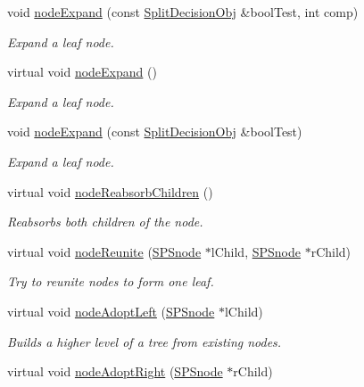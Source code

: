 \begin{DoxyCompactItemize}
void \hyperlink{classsubpavings_1_1SPSnode_a0728b0ec4deee17f6a729a97c8b5a560}{node\-Expand} (const \hyperlink{classsubpavings_1_1SplitDecisionObj}{\-Split\-Decision\-Obj} \&bool\-Test, int comp)
\begin{DoxyCompactList}\small\item\em \-Expand a leaf node. \end{DoxyCompactList}\item 
virtual void \hyperlink{classsubpavings_1_1SPSnode_ae432186483a5ec950dab0eb00b08a9bc}{node\-Expand} ()
\begin{DoxyCompactList}\small\item\em \-Expand a leaf node. \end{DoxyCompactList}\item 
void \hyperlink{classsubpavings_1_1SPSnode_a19a54cd8f89112dbed3f43c2f405921f}{node\-Expand} (const \hyperlink{classsubpavings_1_1SplitDecisionObj}{\-Split\-Decision\-Obj} \&bool\-Test)
\begin{DoxyCompactList}\small\item\em \-Expand a leaf node. \end{DoxyCompactList}\item 
virtual void \hyperlink{classsubpavings_1_1SPSnode_a68cc1a1722c627a99dcefc3491847fb2}{node\-Reabsorb\-Children} ()
\begin{DoxyCompactList}\small\item\em \-Reabsorbs both children of the node. \end{DoxyCompactList}\item 
virtual void \hyperlink{classsubpavings_1_1SPSnode_a61c584952df4fa77109cb4bb9b46f657}{node\-Reunite} (\hyperlink{classsubpavings_1_1SPSnode}{\-S\-P\-Snode} $\ast$l\-Child, \hyperlink{classsubpavings_1_1SPSnode}{\-S\-P\-Snode} $\ast$r\-Child)
\begin{DoxyCompactList}\small\item\em \-Try to reunite nodes to form one leaf. \end{DoxyCompactList}\item 
virtual void \hyperlink{classsubpavings_1_1SPSnode_ae1d11e62b133e13be6c14f7ff759f152}{node\-Adopt\-Left} (\hyperlink{classsubpavings_1_1SPSnode}{\-S\-P\-Snode} $\ast$l\-Child)
\begin{DoxyCompactList}\small\item\em \-Builds a higher level of a tree from existing nodes. \end{DoxyCompactList}\item 
virtual void \hyperlink{classsubpavings_1_1SPSnode_a4049a0078541b24d5451957f6f7dcd68}{node\-Adopt\-Right} (\hyperlink{classsubpavings_1_1SPSnode}{\-S\-P\-Snode} $\ast$r\-Child)

\end{DoxyCompactItemize}
